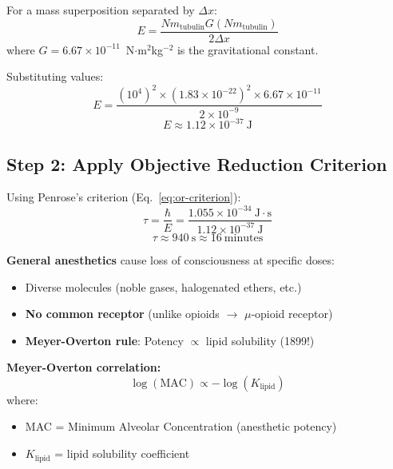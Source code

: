 For a mass superposition separated by $\Delta x$:
\begin{equation}
E = \frac{N m_{\text{tubulin}} G (N m_{\text{tubulin}})}{2\Delta x}
\end{equation}
where $G = 6.67 \times 10^{-11}$~N$\cdot$m$^2$kg$^{-2}$ is the gravitational constant.

Substituting values:
\begin{equation}
E = \frac{(10^4)^2 \times (1.83 \times 10^{-22})^2 \times 6.67 \times 10^{-11}}{2 \times 10^{-9}}
\end{equation}
\begin{equation}
E \approx 1.12 \times 10^{-37}~\text{J}
\end{equation}

\subsection*{Step 2: Apply Objective Reduction Criterion}

Using Penrose's criterion (Eq.~\ref{eq:or-criterion}):
\begin{equation}
\tau = \frac{\hbar}{E} = \frac{1.055 \times 10^{-34}~\text{J}\cdot\text{s}}{1.12 \times 10^{-37}~\text{J}}
\end{equation}
\begin{equation}
\tau \approx 940~\text{s} \approx 16~\text{minutes}
\end{equation}

\textbf{General anesthetics} cause loss of consciousness at specific doses:
\begin{itemize}
\item Diverse molecules (noble gases, halogenated ethers, etc.)
\item \textbf{No common receptor} (unlike opioids $\rightarrow$ $\mu$-opioid receptor)
\item \textbf{Meyer-Overton rule}: Potency $\propto$ lipid solubility (1899!)
\end{itemize}

\textbf{Meyer-Overton correlation:}
\begin{equation}
\label{eq:meyer-overton-mac}
\log(\text{MAC}) \propto -\log(K_{\text{lipid}})
\end{equation}
where:
\begin{itemize}
\item MAC = Minimum Alveolar Concentration (anesthetic potency)
\item $K_{\text{lipid}}$ = lipid solubility coefficient
\end{itemize}

